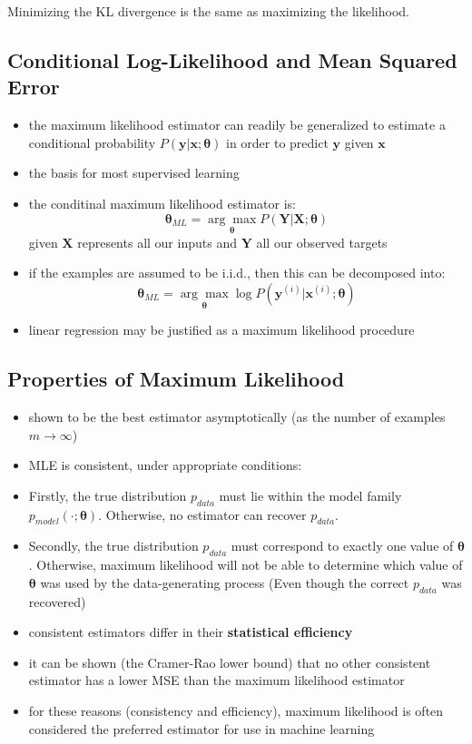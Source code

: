 \documentclass[11pt, twocolumn]{report}
\def\parameter{\bm{\theta}}
\begin{document}
Minimizing the KL divergence is the same as maximizing the likelihood.

\subsection{Conditional Log-Likelihood and Mean Squared Error}
\begin{itemize}
  \item the maximum likelihood estimator can readily be generalized to estimate
    a conditional probability $P(\bm{y} | \bm{x}; \parameter)$ in order to
    predict $\bm{y}$ given $\bm{x}$
  \item the basis for most supervised learning
  \item the conditinal maximum likelihood estimator is:
    \begin{equation}
      \parameter_{ML} = \underset{\parameter}{\arg\max} P(\bm{Y} | \bm{X};
      \parameter)
    \end{equation}
    given $\bm{X}$ represents all our inputs and $\bm{Y}$ all our observed
    targets
  \item if the examples are assumed to be i.i.d., then this can be decomposed
    into:
    \begin{equation}
      \parameter_{ML} = \underset{\parameter}{\arg\max} \log P(\bm{y}^{(i)} |
      \bm{x}^{(i)}; \parameter)
    \end{equation}
  \item linear regression may be justified as a maximum likelihood procedure
\end{itemize}

\subsection{Properties of Maximum Likelihood}
\begin{itemize}
  \item shown to be the best estimator asymptotically (as the number of
    examples $m \to \infty$)
  \item MLE is consistent, under appropriate conditions:
  \item Firstly, the true distribution $p_{data}$ must lie within the model
    family $p_{model}(\cdot ; \parameter)$. Otherwise, no estimator can recover
    $p_{data}$.
  \item Secondly, the true distribution $p_{data}$ must correspond to exactly
    one value of $\parameter$. Otherwise, maximum likelihood will not be able
    to determine which value of $\parameter$ was used by the data-generating
    process (Even though the correct $p_{data}$ was recovered)
  \item consistent estimators differ in their \textbf{statistical efficiency}
  \item it can be shown (the Cramer-Rao lower bound) that no other consistent
    estimator has a lower MSE than the maximum likelihood estimator 
  \item for these reasons (consistency and efficiency), maximum likelihood is
    often considered the preferred estimator for use in machine learning
\end{itemize}
\end{document}
